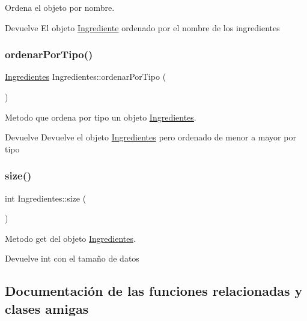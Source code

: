 Ordena el objeto por nombre. 

\begin{DoxyReturn}{Devuelve}
El objeto \hyperlink{classIngrediente}{Ingrediente} ordenado por el nombre de los ingredientes 
\end{DoxyReturn}
\mbox{\label{classIngredientes_a0ed6997b0c31498c42562d91a6df955d}} 
\subsubsection{\texorpdfstring{ordenar\+Por\+Tipo()}{ordenarPorTipo()}}
{\footnotesize\ttfamily \hyperlink{classIngredientes}{Ingredientes} Ingredientes\+::ordenar\+Por\+Tipo (\begin{DoxyParamCaption}{ }\end{DoxyParamCaption})}



Metodo que ordena por tipo un objeto \hyperlink{classIngredientes}{Ingredientes}. 

\begin{DoxyReturn}{Devuelve}
Devuelve el objeto \hyperlink{classIngredientes}{Ingredientes} pero ordenado de menor a mayor por tipo 
\end{DoxyReturn}
\mbox{\label{classIngredientes_aca2d4295b616fd0efeafce91009e0dda}} 
\subsubsection{\texorpdfstring{size()}{size()}}
{\footnotesize\ttfamily int Ingredientes\+::size (\begin{DoxyParamCaption}{ }\end{DoxyParamCaption})}



Metodo get del objeto \hyperlink{classIngredientes}{Ingredientes}. 

\begin{DoxyReturn}{Devuelve}
int con el tamaño de datos 
\end{DoxyReturn}


\subsection{Documentación de las funciones relacionadas y clases amigas}
\mbox{\label{classIngredientes_a933ab431055a2a381448533ff8aa3299}} 
